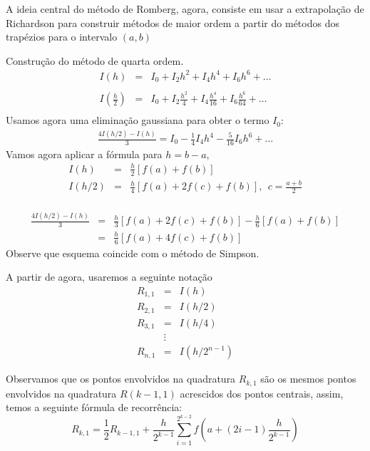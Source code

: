 A ideia central do método de Romberg, agora, consiste em usar a extrapolação de Richardson para construir métodos de maior ordem a partir do métodos dos trapézios para o intervalo $(a,b)$
\begin{ex} \label{exemplo_romberg_1}Construção do método de quarta ordem.
\begin{eqnarray*}
I(h)&=&I_0 + I_2 h^2 + I_4{h^4}+ I_6{h^6}+\ldots\\~\\
I\left(\frac{h}{2}\right)&=&I_0 + I_2 \frac{h^2}{4} + I_4\frac{h^4}{16}+ I_6\frac{h^6}{64}+\ldots\\
\end{eqnarray*}
Usamos agora uma eliminação gaussiana para obter o termo $I_0$:
\begin{eqnarray*}
\frac{4I(h/2)-I(h)}{3}=I_0-\frac{1}{4}I_4h^4-\frac{5}{16}I_6h^6+\ldots
\end{eqnarray*}
Vamos agora aplicar a fórmula para $h=b-a$,
\begin{eqnarray*}
I(h)&=& \frac{h}{2} \left[f(a)+f(b)\right]\\
I(h/2)&=& \frac{h}{4} \left[f(a)+2f\left(c\right)+f(b)\right],~~ c=\frac{a+b}{2}\\
\end{eqnarray*}

\begin{eqnarray*}
\frac{4I(h/2)-I(h)}{3}&=&\frac{h}{3}\left[f(a)+2f\left(c\right)+f(b)\right]-\frac{h}{6} \left[f(a)+f(b)\right]\\
&=&\frac{h}{6}\left[f(a)+4f\left(c\right)+f(b)\right]
\end{eqnarray*}
Observe que esquema coincide com o método de Simpson.
\end{ex}

A partir de agora, usaremos a seguinte notação
\begin{eqnarray*}
R_{1,1}&=&I(h)\\
R_{2,1}&=&I(h/2)\\
R_{3,1}&=&I(h/4)\\
&\vdots&\\
R_{n,1}&=&I(h/2^{n-1})
\end{eqnarray*}

Observamos que os pontos envolvidos na quadratura $R_{k,1}$ são os mesmos pontos envolvidos na quadratura $R(k-1,1)$ acrescidos dos pontos centrais, assim, temos a seguinte fórmula de recorrência:
$$R_{k,1}=\frac{1}{2}R_{k-1,1}+\frac{h}{2^{k-1}} \sum_{i=1}^{2^{k-2}}f\left(a+(2i-1)\frac{h}{2^{k-1}}\right)$$

